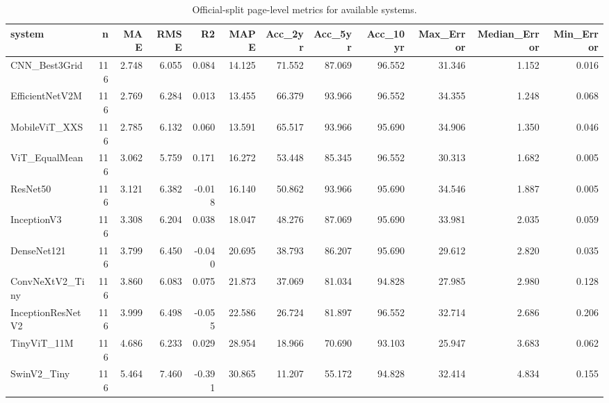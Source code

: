 \begin{table}[htbp]
\centering
\caption{Official-split page-level metrics for available systems.}
\label{tab:single-models-official}
\begin{tabular}{lrrrrrrrrrrr}
\toprule
system & n & MAE & RMSE & R2 & MAPE & Acc\_2yr & Acc\_5yr & Acc\_10yr & Max\_Error & Median\_Error & Min\_Error \\
\midrule
CNN\_Best3Grid & 116 & 2.748 & 6.055 & 0.084 & 14.125 & 71.552 & 87.069 & 96.552 & 31.346 & 1.152 & 0.016 \\
EfficientNetV2M & 116 & 2.769 & 6.284 & 0.013 & 13.455 & 66.379 & 93.966 & 96.552 & 34.355 & 1.248 & 0.068 \\
MobileViT\_XXS & 116 & 2.785 & 6.132 & 0.060 & 13.591 & 65.517 & 93.966 & 95.690 & 34.906 & 1.350 & 0.046 \\
ViT\_EqualMean & 116 & 3.062 & 5.759 & 0.171 & 16.272 & 53.448 & 85.345 & 96.552 & 30.313 & 1.682 & 0.005 \\
ResNet50 & 116 & 3.121 & 6.382 & -0.018 & 16.140 & 50.862 & 93.966 & 95.690 & 34.546 & 1.887 & 0.005 \\
InceptionV3 & 116 & 3.308 & 6.204 & 0.038 & 18.047 & 48.276 & 87.069 & 95.690 & 33.981 & 2.035 & 0.059 \\
DenseNet121 & 116 & 3.799 & 6.450 & -0.040 & 20.695 & 38.793 & 86.207 & 95.690 & 29.612 & 2.820 & 0.035 \\
ConvNeXtV2\_Tiny & 116 & 3.860 & 6.083 & 0.075 & 21.873 & 37.069 & 81.034 & 94.828 & 27.985 & 2.980 & 0.128 \\
InceptionResNetV2 & 116 & 3.999 & 6.498 & -0.055 & 22.586 & 26.724 & 81.897 & 96.552 & 32.714 & 2.686 & 0.206 \\
TinyViT\_11M & 116 & 4.686 & 6.233 & 0.029 & 28.954 & 18.966 & 70.690 & 93.103 & 25.947 & 3.683 & 0.062 \\
SwinV2\_Tiny & 116 & 5.464 & 7.460 & -0.391 & 30.865 & 11.207 & 55.172 & 94.828 & 32.414 & 4.834 & 0.155 \\
\bottomrule
\end{tabular}
\end{table}
